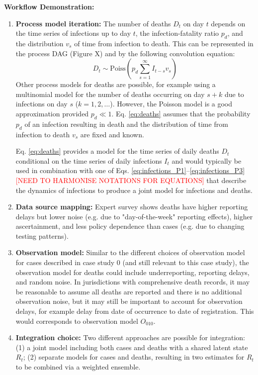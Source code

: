 \documentclass{article}
\begin{document}
\textbf{Workflow Demonstration:}
\begin{enumerate}
    \item \textbf{Process model iteration:} The number of deaths $D_t$ on day $t$ depends on the time series of infections up to day $t$, the infection-fatality ratio $p_d$, and the distribution $v_s$ of time from infection to death. This can be represented in the process DAG (Figure X) and by the following convolution equation:
    \begin{equation} \label{eq:deaths}
        D_t \sim \mathrm{Poiss}\left(p_d \sum_{s=1}^\infty I_{t-s}v_s \right)
    \end{equation}
    Other process models for deaths are possible, for example using a multinomial model for the number of deaths occurring on day $s+k$ due to infections on day $s$ ($k=1,2,\ldots$). However, the Poisson model is a good approximation provided $p_d\ll 1$.
    Eq. \eqref{eq:deaths} assumes that the probability $p_d$ of an infection resulting in death and the distribution of time from infection to death $v_s$ are fixed and known.
    
    Eq. \eqref{eq:deaths} provides a model for the time series of daily deaths $D_t$ conditional on the time series of daily infections $I_t$ and would typically be used in combination with one of Eqs. \eqref{eq:infections_P1}--\eqref{eq:infections_P3} \textcolor{red}{[NEED TO HARMONISE NOTATIONS FOR EQUATIONS]} that describe the dynamics of infections to produce a joint model for infections and deaths. 
    \item \textbf{Data source mapping:} Expert survey shows deaths have higher reporting delays but lower noise (e.g. due to "day-of-the-week" reporting effects), higher ascertainment, and less policy dependence than cases (e.g. due to changing testing patterns).
    \item \textbf{Observation model:} Similar to the different choices of observation model for cases described in case study 0 (and still relevant to this case study), the observation model for deaths could include underreporting, reporting delays, and random noise. In jurisdictions with comprehensive death records, it may be reasonable to assume all deaths are reported and there is no additional observation noise, but it may still be important to account for observation delays, for example delay from date of occurrence to date of registration. This would corresponds to observation model $O_{010}$.
    \item \textbf{Integration choice:} 
       Two different approaches are possible for integration: (1) a joint model including both cases and deaths with a shared latent state $R_t$; (2) separate models for cases and deaths, resulting in two estimates for $R_t$ to be combined via a weighted ensemble. 
       

\end{enumerate}
\end{document}
